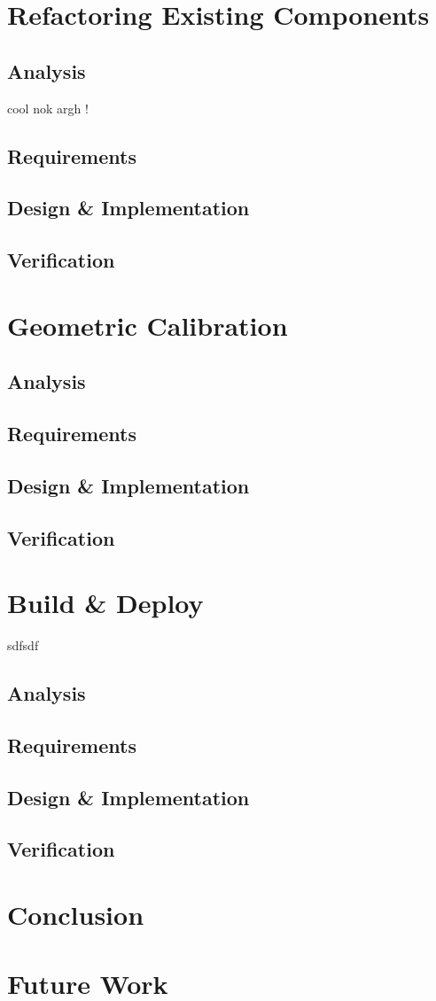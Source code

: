 \documentclass[10pt,a4paper]{memoir}
\begin{document}
\section{Refactoring Existing Components}
\subsection{Analysis}
cool nok
argh !
\subsection{Requirements}
\subsection{Design \& Implementation}
\subsection{Verification}

\section{Geometric Calibration}
\subsection{Analysis}
\subsection{Requirements}
\subsection{Design \& Implementation}
\subsection{Verification}

\section{Build \& Deploy}

\blindtext
\cbstart
sdfsdf
\blindtext
\cbend
\blindtext
\subsection{Analysis}
\subsection{Requirements}
\subsection{Design \& Implementation}
\subsection{Verification}


\section{Conclusion}
\section{Future Work}
\listoftodos
\end{document}
